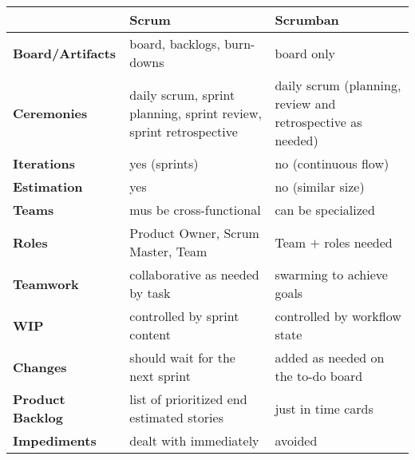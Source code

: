 \documentclass[../main.tex]{subfiles}
\begin{document}
    \begin{table}[H]
        \begin{center}
            \begin{tabular}{| p{3cm} | p{6cm} p{6cm} |}
                \toprule
                & \textbf{Scrum} & \textbf{Scrumban}\\
                \toprule

                \cmidrule(r){1-1}\cmidrule(rl){2-2}\cmidrule(l){3-3}
                \textbf{Board/Artifacts} & board, backlogs, burn-downs & board only\\

                \cmidrule(r){1-1}\cmidrule(rl){2-2}\cmidrule(l){3-3}
                \textbf{Ceremonies} & daily scrum, sprint planning, sprint review, sprint retrospective
                & daily scrum (planning, review and retrospective as needed)\\

                \cmidrule(r){1-1}\cmidrule(rl){2-2}\cmidrule(l){3-3}
                \textbf{Iterations} & yes (sprints) & no (continuous flow)\\

                \cmidrule(r){1-1}\cmidrule(rl){2-2}\cmidrule(l){3-3}
                \textbf{Estimation} & yes & no (similar size)\\

                \cmidrule(r){1-1}\cmidrule(rl){2-2}\cmidrule(l){3-3}
                \textbf{Teams} & mus be cross-functional & can be specialized\\

                \cmidrule(r){1-1}\cmidrule(rl){2-2}\cmidrule(l){3-3}
                \textbf{Roles} & Product Owner, Scrum Master, Team & Team $+$ roles needed\\

                \cmidrule(r){1-1}\cmidrule(rl){2-2}\cmidrule(l){3-3}
                \textbf{Teamwork} & collaborative as needed by task & swarming to achieve goals\\

                \cmidrule(r){1-1}\cmidrule(rl){2-2}\cmidrule(l){3-3}
                \textbf{WIP} & controlled by sprint content & controlled by workflow state\\

                \cmidrule(r){1-1}\cmidrule(rl){2-2}\cmidrule(l){3-3}
                \textbf{Changes} & should wait for the next sprint & added as needed on the to-do board\\

                \cmidrule(r){1-1}\cmidrule(rl){2-2}\cmidrule(l){3-3}
                \textbf{Product Backlog} & list of prioritized end estimated stories & just in time cards\\

                \cmidrule(r){1-1}\cmidrule(rl){2-2}\cmidrule(l){3-3}
                \textbf{Impediments} & dealt with immediately & avoided\\

                \bottomrule
            \end{tabular}
        \end{center}
    \end{table}
\end{document}
